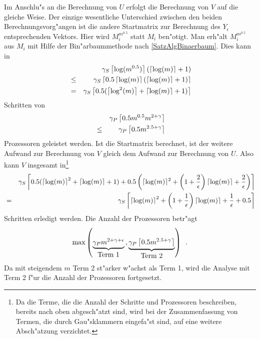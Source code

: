 Im Anschlu"s an die Berechnung von $U$ erfolgt
die Berechnung von $V$ auf die gleiche Weise.
Der einzige wesentliche Unterschied zwischen den beiden
Berechnungsvorg"angen ist die andere
Startmatrix zur Berechnung des $Y_{\epsilon}$ entsprechenden Vektors. Hier
wird $M_i^{m^{0.5}}$ statt $M_i$ ben"otigt. Man erh"alt $M_i^{m^{0.5}}$
aus $M_i$ mit Hilfe der Bin"arbaummethode
nach \ref{SatzAlgBinaerbaum}. Dies kann in
\begin{eqnarray*}
    &      & \gamma_S \left\lceil \log(m^{0.5}) \right\rceil (\left\lceil \log(m) \right\rceil + 1)
\\  & \leq & \gamma_S \left\lceil 0.5 \left\lceil \log(m) \right\rceil (\left\lceil \log(m) \right\rceil + 1) \right\rceil
\\  & =    & \gamma_S \left\lceil 0.5 (\left\lceil \log^2(m) \right\rceil + \left\lceil \log(m) \right\rceil + 1)  \right\rceil
\end{eqnarray*}
Schritten von
\begin{eqnarray*}
    &      & \gamma_P \left\lceil 0.5 m^{0.5} m^{2+\gamma} \right\rceil
\\  & \leq & \gamma_P \left\lceil 0.5 m^{2.5+\gamma} \right\rceil
\end{eqnarray*}
Prozessoren geleistet werden.
Ist die Startmatrix berechnet, ist der weitere Aufwand zur Berechnung von
$V$ gleich dem Aufwand zur Berechnung von $U$. Also kann $V$ insgesamt 
in\footnote{Da die Terme, die die Anzahl der Schritte und Prozessoren
    beschreiben, bereits nach oben abgesch"atzt sind, wird bei der
    Zusammenfassung von Termen, die durch Gau"sklammern eingefa"st sind,
    auf eine weitere Absch"atzung verzichtet.}
\begin{eqnarray*}
   & & \gamma_S \left\lceil 0.5 (\left\lceil \log(m) \right\rceil^2 + \left\lceil \log(m) \right\rceil + 1) +
           0.5  \left( \lceil \log(m) \rceil^2 +
           \left( 1 + \frac{2}{\epsilon} \right) \lceil \log(m) \rceil +
           \frac{2}{\epsilon} \right)
       \right\rceil
\\ & = & \gamma_S
     \left\lceil
         \left\lceil \log(m) \right\rceil^2 + 
         \left( 1 + \frac{1}{\epsilon} \right) \left\lceil \log(m) \right\rceil + 
         \frac{1}{\epsilon} + 0.5
     \right\rceil
\end{eqnarray*}
Schritten erledigt werden. Die Anzahl der Prozessoren betr"agt
\begin{eqnarray*}
    \max \left( 
              \underbrace{ \gamma_P m^{2+\gamma+\epsilon} }_{\mbox{Term 1}}
         \, ,
              \underbrace{ \gamma_P \left\lceil 0.5 m^{2.5+\gamma} \right\rceil 
                         }_{\mbox{Term 2}}
         \right) \mbox{\hspace{0.5em}.}
\end{eqnarray*}
Da mit steigendem $m$ Term 2 st"arker w"achst als Term 1, wird die 
Analyse mit Term 2 f"ur die Anzahl der Prozessoren fortgesetzt.

